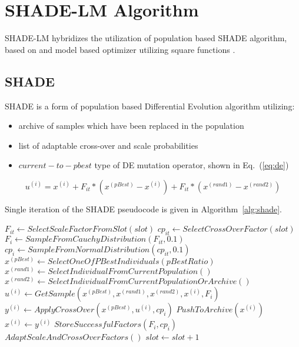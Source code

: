 \documentclass[sigconf]{acmart}
\begin{document}
\section{SHADE-LM Algorithm}

SHADE-LM hybridizes the utilization of population based SHADE
algorithm, based on \cite{Tanabe2014} and model based optimizer
utilizing square functions \cite{zaborski2020analysis}.

\subsection{SHADE}

SHADE is a form of population based Differential Evolution algorithm utilizing:
\begin{itemize}
	\item archive of samples which have been replaced in the population
	\item list of adaptable cross-over and scale probabilities
	\item $current-to-pbest$ type of DE mutation operator, shown in Eq.~(\ref{eq:de}) 
\end{itemize}

\begin{equation}
	u^{(i)} = x^{(i)} + F_{it} * (x^{(pBest)} - x^{(i)}) + F_{it} * (x^{(rand1)} - x^{(rand2)})
	\label{eq:de}
\end{equation}

Single iteration of the SHADE pseudocode is given in Algorithm~\ref{alg:shade}.

\begin{algorithm}[ht]
	\begin{algorithmic}[1]
	\footnotesize
	\State $F_{it} \gets SelectScaleFactorFromSlot(slot)$
	\State $cp_{it} \gets SelectCrossOverFactor(slot)$
		\State $F_{i} \gets SampleFromCauchyDistribution(F_{it}, 0.1)$
		\State $cp_{i} \gets SampleFromNormalDistribution(cp_{it}, 0.1)$
		\State $x^{(pBest)} \gets SelectOneOfPBestIndividuals(pBestRatio)$
		\State $x^{(rand1)} \gets SelectIndividualFromCurrentPopulation()$
		\State $x^{(rand2)} \gets SelectIndividualFromCurrentPopulationOrArchive()$
		\State $u^{(i)} \gets GetSample(x^{(pBest)}, x^{(rand1)}, x^{(rand2)}, x^{(i)}, F_{i})$
		\State $y^{(i)} \gets ApplyCrossOver(x^{(pBest)}, u^{(i)}, cp_{i})$
			\State $PushToArchive(x^{(i)})$
			\State $x^{(i)} \gets y^{(i)}$
			\State $StoreSuccessfulFactors(F_{i}, cp_{i})$
		\EndIf
	\EndFor
	\State $AdaptScaleAndCrossOverFactors()$
	\State $slot \gets slot + 1$
\caption{Single iteration of SHADE%
  \label{alg:shade}}
  \end{algorithmic}
  \end{algorithm}
\end{document}
